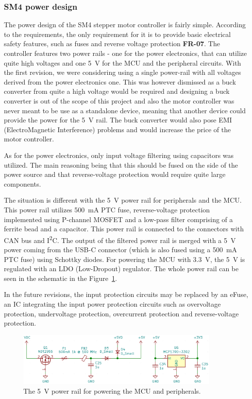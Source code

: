 \subsubsection{SM4 power design}
\label{subsubsec:power_design}
The power design of the SM4 stepper motor controller is fairly simple.
According to the requirements, the only requirement for it is to provide basic electrical safety features, such as fuses and reverse voltage protection \textbf{FR-07}.
The controller features two power rails - one for the power electronics, that can utilize quite high voltages and one 5~V for the MCU and the peripheral circuits.
With the first revision, we were considering using a single power-rail with all voltages derived from the power electronics one.
This was however dismissed as a buck converter from quite a high voltage would be required and designing a buck converter is out of the scope of this project and also the motor controller was never meant to be use as a standalone device, meaning that another device could provide the power for the 5~V rail.
The buck converter would also pose EMI (ElectroMagnetic Interference) problems and would increase the price of the motor controller.

As for the power electronics, only input voltage filtering using capacitors was utilized.
The main reasoning being that this should be fused on the side of the power source and that reverse-voltage protection would require quite large components.

The situation is different with the 5~V power rail for peripherals and the MCU.
This power rail utilizes 500~mA PTC fuse, reverse-voltage protection implemented using P-channel MOSFET and a low-pass filter comprising of a ferrite bead and a capacitor.
This power rail is connected to the connectors with CAN bus and I\textsuperscript{2}C.
The output of the filtered power rail is merged with a 5~V power coming from the USB-C connector (which is also fused using a 500~mA PTC fuse) using Schottky diodes.
For powering the MCU with 3.3~V, the 5~V is regulated with an LDO (Low-Dropout) regulator.
The whole power rail can be seen in the schematic in the Figure~\ref{fig:power}.

In the future revisions, the input protection circuits may be replaced by an eFuse\cite{greatscott_best_2021,texas_instruments_efuse_2021}, an IC integrating the input power protection circuits such as overvoltage protection, undervoltage protection, overcurrent protection and reverse-voltage protection.

\begin{figure}[H]
    \centering
    \includegraphics[width=0.9\textwidth]{obrazky/power}
    \caption{The 5~V power rail for powering the MCU and peripherals.}
    \label{fig:power}
\end{figure}

